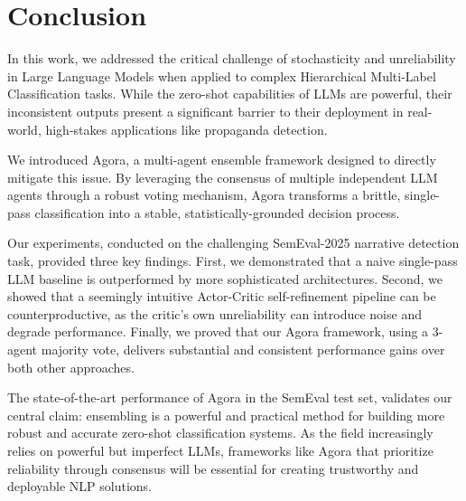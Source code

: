 \section{Conclusion}

In this work, we addressed the critical challenge of stochasticity and unreliability in Large Language Models when applied to complex Hierarchical Multi-Label Classification tasks. While the zero-shot capabilities of LLMs are powerful, their inconsistent outputs present a significant barrier to their deployment in real-world, high-stakes applications like propaganda detection.

We introduced Agora, a multi-agent ensemble framework designed to directly mitigate this issue. By leveraging the consensus of multiple independent LLM agents through a robust voting mechanism, Agora transforms a brittle, single-pass classification into a stable, statistically-grounded decision process.

Our experiments, conducted on the challenging SemEval-2025 narrative detection task, provided three key findings. First, we demonstrated that a naive single-pass LLM baseline is outperformed by more sophisticated architectures. Second, we showed that a seemingly intuitive Actor-Critic self-refinement pipeline can be counterproductive, as the critic's own unreliability can introduce noise and degrade performance. Finally, we proved that our Agora framework, using a 3-agent majority vote, delivers substantial and consistent performance gains over both other approaches.

The state-of-the-art performance of Agora in the SemEval test set, validates our central claim: ensembling is a powerful and practical method for building more robust and accurate zero-shot classification systems. As the field increasingly relies on powerful but imperfect LLMs, frameworks like Agora that prioritize reliability through consensus will be essential for creating trustworthy and deployable NLP solutions.